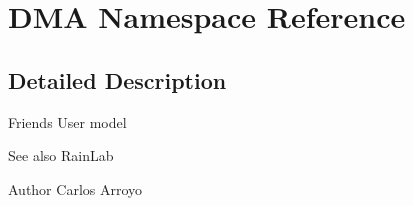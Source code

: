 \hypertarget{namespaceDMA}{\section{D\+M\+A Namespace Reference}
\label{namespaceDMA}
}


\subsection{Detailed Description}
Friends User model  \begin{DoxySeeAlso}{See also}
Rain\+Lab 
\end{DoxySeeAlso}
\begin{DoxyAuthor}{Author}
Carlos Arroyo 
\end{DoxyAuthor}
